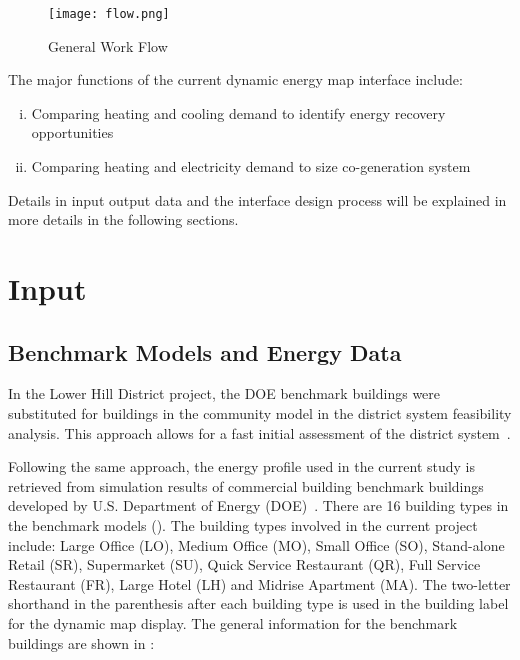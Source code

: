 \begin{figure}[h!]
  \centering
  \texttt{[image: flow.png]}
  \caption[General Work Flow]{General Work Flow}
  \label{fig:flow}
\end{figure}

The major functions of the current dynamic energy map interface
include:
\begin{enumerate}[i.]
\item Comparing heating and cooling demand to identify energy recovery
  opportunities
\item Comparing heating and electricity demand to size co-generation
  system
\end{enumerate}

Details in input output data and the interface design process will be
explained in more details in the following sections.
\newpage
\section{Input}
\subsection{Benchmark Models and Energy Data}
In the Lower Hill District project, the DOE benchmark buildings were
substituted for buildings in the community model in the district
system feasibility analysis. This approach allows for a fast initial
assessment of the district system~\cite{baird2014}.

Following the same approach, the energy profile used in the current
study is retrieved from simulation results of commercial building
benchmark buildings developed by U.S. Department of Energy
(DOE)~\cite{DOE2015}. There are 16 building types in the benchmark
models (). The building types involved in the
current project include: Large Office (LO), Medium Office (MO), Small
Office (SO), Stand-alone Retail (SR), Supermarket (SU), Quick Service
Restaurant (QR), Full Service Restaurant (FR), Large Hotel (LH) and
Midrise Apartment (MA). The two-letter shorthand in the parenthesis
after each building type is used in the building label for the dynamic
map display. The general information for the benchmark buildings are
shown in :

